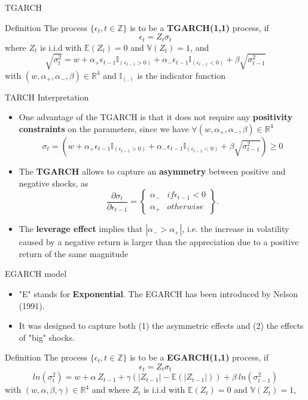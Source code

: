 \documentclass{beamer}
\def\Z{\mathbb{Z}}
\def\R{\mathbb{R}}
\def\Esp{\mathbb{E}}
\def\Var{\mathbb{V}}
\newcommand{\imfbold}[1]{\textbf{\textcolor{imfblue}{#1}}}
\begin{document}
\begin{frame}{TGARCH}

    \begin{block}{Definition}
        The process $\{\epsilon_t, t \in \Z\}$ is to be a \textbf{TGARCH(1,1)} process, if
        $$\epsilon_t = Z_t\sigma_t$$
        where $Z_t$ is i.i.d with $\Esp(Z_t) = 0$ and $\Var(Z_t)=1$, and 
        $$\sqrt{\sigma_t^2} = w+\alpha_{+}\epsilon_{t-1}\mathbb{I}_{(\epsilon_{t-1}>0)}+\alpha_{-}\epsilon_{t-1}\mathbb{I}_{(\epsilon_{t-1}<0)} + \beta\sqrt{\sigma_{t-1}^2}$$
        with $(w,\alpha_{+},\alpha_{-}, \beta) \in \R^4$ and $\mathbb{I}_{(.)}$ is the indicator function
    \end{block}
\end{frame}
\begin{frame}{TARCH Interpretation}
    \begin{itemize}
        \item One advantage of the TGARCH is that it does not require any \imfbold{positivity constraints} on the parameters, since we have $\forall (w,\alpha_{+},\alpha_{-}, \beta) \in \R^4$
        $$\sigma_t = \left( w+\alpha_{+}\epsilon_{t-1}\mathbb{I}_{(\epsilon_{t-1}>0)}+\alpha_{-}\epsilon_{t-1}\mathbb{I}_{(\epsilon_{t-1}<0)} + \beta\sqrt{\sigma_{t-1}^2} \right) \geq 0$$
        \item The \imfbold{TGARCH} allows to capture an \imfbold{asymmetry} between positive and negative shocks, as 
        $$\frac{\partial\sigma_t}{\partial\epsilon_{t-1}} = \left\{
        \begin{matrix}
                         \alpha_{-} & if \epsilon_{t-1} <0\\ 
                         \alpha_{+} & otherwise
        \end{matrix}
        \right\}.$$
        \item The \imfbold{leverage effect} implies that $|\alpha_{-} > \alpha_{+}|$, i.e. the increase in volatility caused by a negative return is larger than the appreciation due to a positive return of the same magnitude
    \end{itemize}
\end{frame}

\begin{frame}{EGARCH model}
    \begin{itemize}
        \item "E" stands for \imfbold{Exponential}. The EGARCH has been introduced by Nelson (1991).
        \item It was designed to capture both (1) the asymmetric effects and (2) the effects of "big" shocks.     
    \end{itemize}
    \begin{block}{Definition}
        The process $\{\epsilon_t, t \in \Z\}$ is to be a \textbf{EGARCH(1,1)} process, if
        $$\epsilon_t = Z_t\sigma_t$$
        $$ln(\sigma_t^2) =w + \alpha~ Z_{t-1} + \gamma\left(|Z_{t-1}| - \Esp(|Z_{t-1}|)\right) +\beta~ln(\sigma_{t-1}^2)$$
        with $(w,\alpha,\beta, \gamma) \in \R^4$ and where $Z_t$ is i.i.d with $\Esp(Z_t) = 0$ and $\Var(Z_t)=1$,
    \end{block}
\end{frame}
\end{document}
